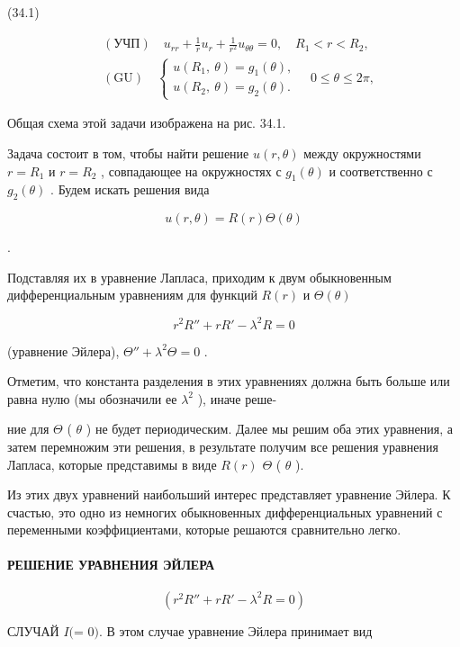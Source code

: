 \documentclass[
  ukrainian,
]{article}
\begin{document}
(34.1)

\[
\begin{aligned} & (\text{УЧП}) \quad u_{rr} + \frac{1}{r} u_r + \frac{1}{r^2} u_{\theta\theta} = 0, \quad R_1 < r < R_2, \\ & (\text{GU}) \quad \begin{cases} u(R_1, \ \theta) = g_1(\theta), \\ u(R_2, \ \theta) = g_2(\theta). \end{cases} \quad 0 \leqslant \theta \leqslant 2\pi, \end{aligned}
\]

Общая схема этой задачи изображена на рис. 34.1.

Задача состоит в том, чтобы найти решение \(u(r, \theta)\) между
окружностями \(r = R_1\) и \(r = R_2\) , совпадающее на окружностях с
\(g_1(\theta)\) и соответственно с \(g_2(\theta)\) . Будем искать
решения вида

\[
u(r, \theta) = R(r) \Theta(\theta)
\]

.

Подставляя их в уравнение Лапласа, приходим к двум обыкновенным
дифференциальным уравнениям для функций \(R(r)\) и \(\Theta(\theta)\)

\[
r^2R'' + rR' - \lambda^2R = 0
\]

(уравнение Эйлера), \(\Theta'' + \lambda^2\Theta = 0\) .

Отметим, что константа разделения в этих уравнениях должна быть больше
или равна нулю (мы обозначили ее \(\lambda^2\) ), иначе реше-

ние для \(\Theta\) ( \(\theta\) ) не будет периодическим. Далее мы решим
оба этих уравнения, а затем перемножим эти решения, в результате получим
все решения уравнения Лапласа, которые представимы в виде \(R (r)\)
\(\Theta\) ( \(\theta\) ).

Из этих двух уравнений наибольший интерес представляет уравнение Эйлера.
К счастью, это одно из немногих обыкновенных дифференциальных уравнений
с переменными коэффициентами, которые решаются сравнительно легко.

\paragraph{РЕШЕНИЕ УРАВНЕНИЯ
ЭЙЛЕРА}\label{ux440ux435ux448ux435ux43dux438ux435-ux443ux440ux430ux432ux43dux435ux43dux438ux44f-ux44dux439ux43bux435ux440ux430}

\[
(r^2R'' + rR' - \lambda^2R = 0)
\]

СЛУЧАЙ \(I (\)\lambda = 0\()\). В этом случае уравнение Эйлера принимает
вид
\end{document}

